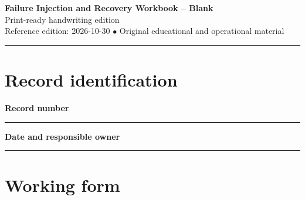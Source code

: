 \documentclass[10pt,letterpaper]{article}
\begin{document}
\begin{center}
{\LARGE\bfseries\color{cdblue}Failure Injection and Recovery Workbook -- Blank}\\[7pt]
{\large Print-ready handwriting edition}\\[6pt]
{\small Reference edition: 2026-10-30 $\bullet$ Original educational and operational material}
\end{center}
\noindent\color{cdblue}\rule{\linewidth}{1.2pt}\color{black}
\vspace{0.4em}
\section{Record identification}
\textbf{Record number}\par
\noindent\rule{\linewidth}{0.35pt}\par\vspace{0.7em}
\textbf{Date and responsible owner}\par
\noindent\rule{\linewidth}{0.35pt}\par\vspace{0.7em}

\section{Working form}
\end{document}
